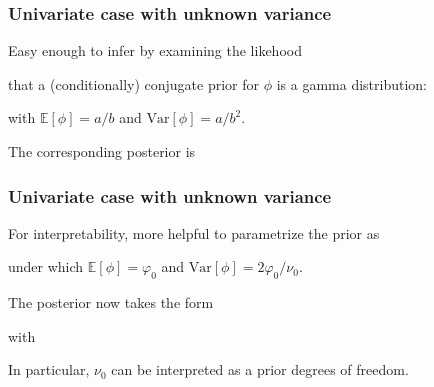 \documentclass[18pt, handout]{beamer}
\newcommand{\defineTightItemizeSpacing}{%
	\setlength{\abovedisplayskip}{.25\baselineskip}%
	\setlength{\belowdisplayskip}{.25\baselineskip}%
}
\newenvironment{tightEquation*}{%
	\defineTightItemizeSpacing%
	\begin{equation*}
}{
	\end{equation*} \ignorespacesafterend
}
\newcommand{\given}{\thinnerspace | \thinnerspace}
\newcommand{\thinnerspace}{\mskip.5\thinmuskip}
\newcommand{\expectation}{\mathbb{E}}
\newcommand{\variance}{\mathrm{Var}}
\newcommand{\gammaDist}{\mathrm{Gamma}}
\newcommand{\density}{\pi}
\newcommand{\likelihood}{L}
\begin{document}
\begin{frame}
\frametitle{Univariate case with unknown variance}
Easy enough to infer by examining the likehood
that a (conditionally) conjugate prior for $\phi$ is a gamma distribution:
with $\expectation[\phi] = a / b$ and $\variance[\phi] = a / b^2$.

\smallskip
The corresponding posterior is
\end{frame}

\begin{frame}
\frametitle{Univariate case with unknown variance}
For interpretability, more helpful to parametrize the prior as 
under which $\expectation[\phi] = \varphi_0$ and $\variance[\phi] = 2 \varphi_0 / \nu_0$.

\medskip
The posterior now takes the form
with

\smallskip
In particular, $\nu_0$ can be interpreted as a prior degrees of freedom.
\end{frame}
\end{document}
